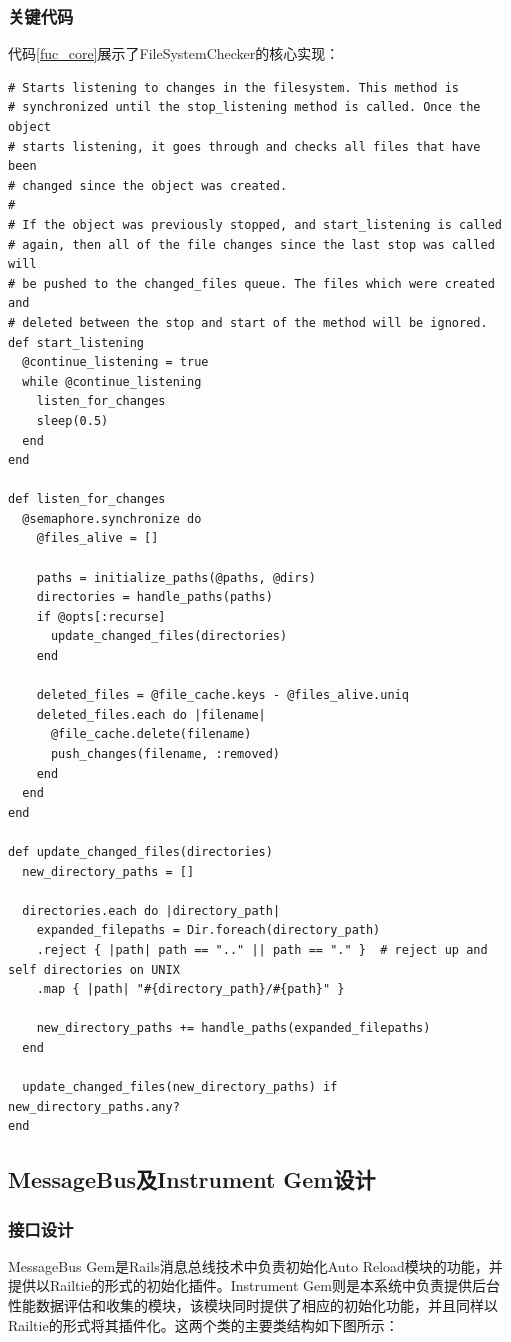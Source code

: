 \subsubsection{关键代码}
代码\ref{fuc_core}展示了FileSystemChecker的核心实现：
\begin{lstlisting}[caption={FileSystemChecker核心代码展示}, label=fuc_core]
# Starts listening to changes in the filesystem. This method is
# synchronized until the stop_listening method is called. Once the object
# starts listening, it goes through and checks all files that have been
# changed since the object was created.
#
# If the object was previously stopped, and start_listening is called
# again, then all of the file changes since the last stop was called will
# be pushed to the changed_files queue. The files which were created and
# deleted between the stop and start of the method will be ignored.
def start_listening
  @continue_listening = true
  while @continue_listening
    listen_for_changes
    sleep(0.5)
  end
end

def listen_for_changes
  @semaphore.synchronize do
    @files_alive = []

    paths = initialize_paths(@paths, @dirs)
    directories = handle_paths(paths)
    if @opts[:recurse]
      update_changed_files(directories)
    end

    deleted_files = @file_cache.keys - @files_alive.uniq
    deleted_files.each do |filename|
      @file_cache.delete(filename)
      push_changes(filename, :removed)
    end
  end
end

def update_changed_files(directories)
  new_directory_paths = []

  directories.each do |directory_path|
    expanded_filepaths = Dir.foreach(directory_path)
    .reject { |path| path == ".." || path == "." }  # reject up and self directories on UNIX
    .map { |path| "#{directory_path}/#{path}" }

    new_directory_paths += handle_paths(expanded_filepaths)
  end

  update_changed_files(new_directory_paths) if new_directory_paths.any?
end
\end{lstlisting}

\subsection{MessageBus及Instrument Gem设计}
\subsubsection{接口设计}
MessageBus Gem是Rails消息总线技术中负责初始化Auto Reload模块的功能，并提供以Railtie的形式的初始化插件。Instrument Gem则是本系统中负责提供后台性能数据评估和收集的模块，该模块同时提供了相应的初始化功能，并且同样以Railtie的形式将其插件化。这两个类的主要类结构如下图所示：

